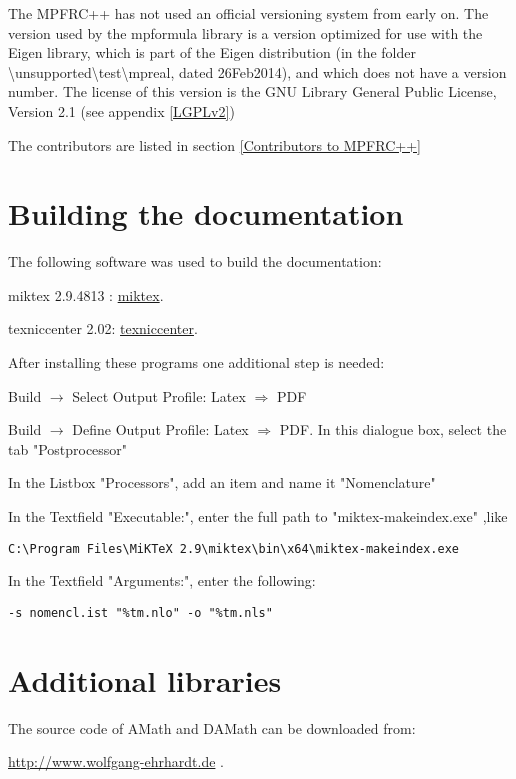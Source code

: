 The MPFRC++ has not used an official versioning system from early on. The version used by the mpformula library is a version optimized for use with the Eigen library, which is part of the Eigen distribution (in the folder \textbackslash unsupported\textbackslash test\textbackslash mpreal, dated 26Feb2014), and which does not have a version number. The license of this version is the GNU Library General Public License, Version 2.1 (see appendix \ref{LGPLv2})

The contributors are listed in section \ref{Contributors to MPFRC++}



\newpage
\section{Building the documentation}
The following software was used to build the documentation:

miktex 2.9.4813 : \href{http://miktex.org/}{miktex}.

texniccenter 2.02: \href{http://www.texniccenter.org/}{texniccenter}.

After installing these programs one additional step is needed: 

Build $\rightarrow$ Select Output Profile: Latex $\Rightarrow$ PDF

Build $\rightarrow$ Define Output Profile: Latex $\Rightarrow$ PDF. In this dialogue box, select the tab "Postprocessor"

In the Listbox "Processors", add an item and name it "Nomenclature"

In the Textfield "Executable:", enter the full path to "miktex-makeindex.exe" ,like 
\begin{verbatim}
C:\Program Files\MiKTeX 2.9\miktex\bin\x64\miktex-makeindex.exe
\end{verbatim}
In the Textfield "Arguments:", enter the following:
\begin{verbatim}
-s nomencl.ist "%tm.nlo" -o "%tm.nls"
\end{verbatim}




\newpage
\section{Additional libraries}


\vpara
The source code of AMath and DAMath can be downloaded from:

\vpara
\href{http://www.wolfgang-ehrhardt.de}{http://www.wolfgang-ehrhardt.de} . 

